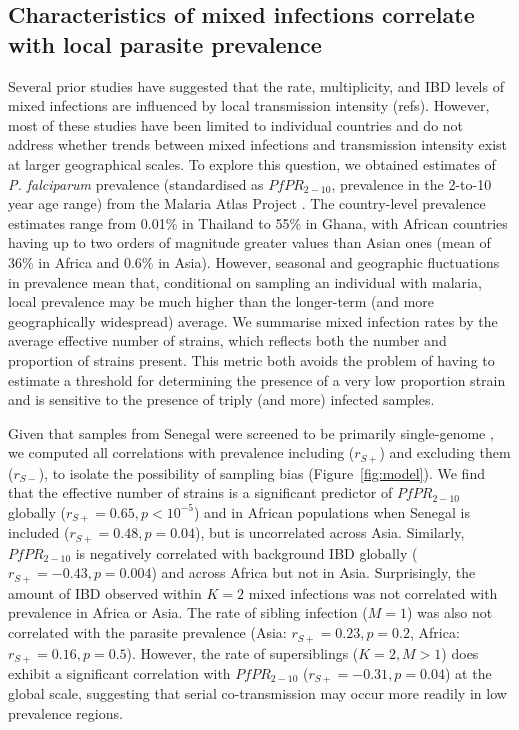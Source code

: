 \documentclass[9pt,lineno]{elife}
\begin{document}
\subsection{Characteristics of mixed infections correlate with local parasite prevalence}

Several prior studies have suggested that the rate, multiplicity, and IBD levels of mixed infections are influenced by local transmission intensity (refs). However, most of these studies have been limited to individual countries and do not address whether trends between mixed infections and transmission intensity exist at larger geographical scales. To explore this question, we obtained estimates of {\it P. falciparum} prevalence (standardised as $PfPR_{2-10}$, prevalence in the 2-to-10 year age range) from the Malaria Atlas Project \citep[see Table~\ref{tab:Pf3k}]{MAP2017}. The country-level prevalence estimates range from 0.01\% in Thailand to 55\% in Ghana, with African countries having up to two orders of magnitude greater values than Asian ones (mean of 36\% in Africa and 0.6\% in Asia). However, seasonal and geographic fluctuations in prevalence mean that, conditional on sampling an individual with malaria, local prevalence may be much higher than the longer-term (and more geographically widespread) average. We summarise mixed infection rates by the average effective number of strains, which reflects both the number and proportion of strains present.  This metric both avoids the problem of having to estimate a threshold for determining the presence of a very low proportion strain and is sensitive to the presence of triply (and more) infected samples.

Given that samples from Senegal were screened to be primarily single-genome \citep{Daniels2015}, we computed all correlations with prevalence including ($r_{S+}$) and excluding them ($r_{S-}$), to isolate the possibility of sampling bias (Figure~\ref{fig:model}). We find that the effective number of strains is a significant predictor of $PfPR_{2-10}$ globally ($r_{S+} = 0.65, p < 10^{-5}$) and in African populations when Senegal is included ($r_{S+} = 0.48, p=0.04$), but is uncorrelated across Asia.  Similarly, $PfPR_{2-10}$ is negatively correlated with background IBD globally ($r_{S+} = -0.43, p=0.004$) and across Africa but not in Asia.  Surprisingly, the amount of IBD observed within $K=2$ mixed infections was not correlated with prevalence in Africa or Asia. The rate of sibling infection ($M=1$) was also not correlated with the parasite prevalence (Asia: $r_{S+} = 0.23, p=0.2$, Africa: $r_{S+} = 0.16, p=0.5$). However, the rate of supersiblings ($K=2, M>1$) does exhibit a significant correlation with $PfPR_{2-10}$ ($r_{S+} = -0.31, p=0.04$) at the global scale, suggesting that serial co-transmission may occur more readily in low prevalence regions.
\end{document}
